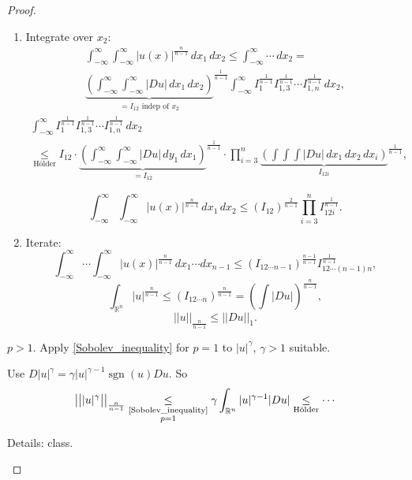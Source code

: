 \documentclass[12pt]{article}
\DeclareMathOperator{\sgn}{sgn}
\theoremstyle{definition}
\begin{document}
\begin{proof}
\begin{enumerate}[label=\alph*)]
\begin{enumerate}[label=\arabic*.]
\item Integrate over $x_2$:
\begin{multline*}
\int_{-\infty}^{\infty}\int_{-\infty}^{\infty}|u(x)|^{\frac{n}{n-1}}\,dx_1\,dx_2\leq\int_{-\infty}^{\infty}\cdots\,dx_2=\\
{\underbrace{\left(\int_{-\infty}^{\infty}\int_{-\infty}^{\infty}|Du|\,dx_1\,dx_2\right)}_{=I_{12}\text{ indep of }x_2}}^{\frac{1}{n-1}}\int_{-\infty}^{\infty}I_1^{\frac{1}{n-1}}I_{1,3}^{\frac{1}{n-1}}\cdots I_{1,n}^{\frac{1}{n-1}}\,dx_2,
\end{multline*}
\begin{multline*}
\int_{-\infty}^{\infty}I_1^{\frac{1}{n-1}}I_{1,3}^{\frac{1}{n-1}}\cdots I_{1,n}^{\frac{1}{n-1}}\,dx_2\\
\underset{\text{H\"{o}lder}}{\leq}I_{12}\cdot{\underbrace{\left(\int_{-\infty}^{\infty}\int_{-\infty}^{\infty}|Du|\,dy_1\,dx_1\right)}_{=I_{12}}}^{\frac{1}{n-1}}\cdot\prod_{i=3}^n{\underbrace{\left(\int\int\int|Du|\,dx_1\,dx_2\,dx_i\right)}_{I_{12i}}}^{\frac{1}{n-1}},
\end{multline*}

\[\int_{-\infty}^{\infty}\int_{-\infty}^{\infty}|u(x)|^{\frac{n}{n-1}}\,dx_1\,dx_2\leq(I_{12})^{\frac{2}{n-1}}\prod_{i=3}^nI_{12i}^{\frac{1}{n-1}}.\]

\item Iterate:
\[\int_{-\infty}^{\infty}\cdots\int_{-\infty}^{\infty}|u(x)|^{\frac{n}{n-1}}\,dx_1\cdots dx_{n-1}\leq(I_{12\cdots n-1})^{\frac{n-1}{n-1}}I_{12\cdots(n-1)n}^{\frac{1}{n-1}},\]
\[\int_{\mathbb{R}^n}|u|^{\frac{n}{n-1}}\leq(I_{12\cdots n})^{\frac{n}{n-1}}=\left(\int|Du|\right)^{\frac{n}{n-1}},\]
\[||u||_{\frac{n}{n-1}}\leq||Du||_1.\]
\end{enumerate}

$p>1$. Apply \eqref{Sobolev_inequality} for $p=1$ to $|u|^{\gamma}$, $\gamma>1$ suitable.

Use $D|u|^{\gamma}=\gamma|u|^{\gamma-1}\sgn(u)Du$. So
\[\big|\big||u|^{\gamma}\big|\big|_{\frac{n}{n-1}}\underset{\substack{\text{\eqref{Sobolev_inequality}}\\p=1}}{\leq}\gamma\int_{\mathbb{R}^n}|u|^{\gamma-1}|Du|\underset{\text{H\"{o}lder}}{\leq}\cdots\]

Details: class.
\end{enumerate}
\end{proof}
\end{document}

